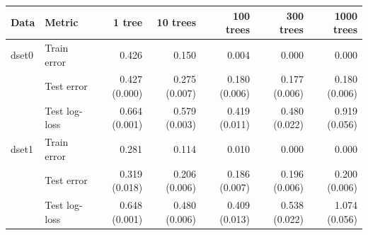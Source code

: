 \begin{tabular}{llrrrrr}
\toprule
Data & Metric & 1 tree & 10 trees & 100 trees & 300 trees & 1000 trees \\
\midrule
dset0 & Train error & 0.426 & 0.150 & 0.004 & 0.000 & 0.000 \\
 & Test error & 0.427 (0.000) & 0.275 (0.007) & 0.180 (0.006) & 0.177 (0.006) & 0.180 (0.006) \\
 & Test log-loss & 0.664 (0.001) & 0.579 (0.003) & 0.419 (0.011) & 0.480 (0.022) & 0.919 (0.056) \\
\midrule
dset1 & Train error & 0.281 & 0.114 & 0.010 & 0.000 & 0.000 \\
 & Test error & 0.319 (0.018) & 0.206 (0.006) & 0.186 (0.007) & 0.196 (0.006) & 0.200 (0.006) \\
 & Test log-loss & 0.648 (0.001) & 0.480 (0.006) & 0.409 (0.013) & 0.538 (0.022) & 1.074 (0.056) \\
\bottomrule
\end{tabular}
